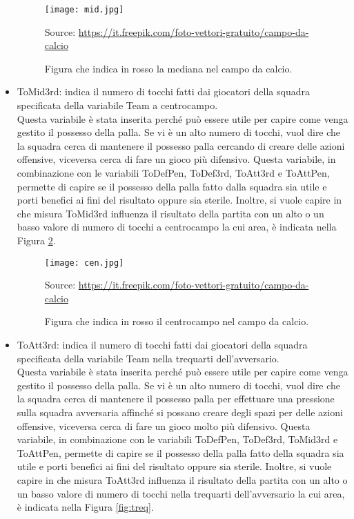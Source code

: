 \begin{itemize}
	\begin{figure}[!ht]
		\begin{center}
			\texttt{[image: mid.jpg]}
			\caption{Figura che indica in rosso la mediana nel campo da calcio.} 
			Source: \url{https://it.freepik.com/foto-vettori-gratuito/campo-da-calcio} 
			\label{fig:def}
		\end{center}
	\end{figure}
	\item \textsf{ToMid3rd}: indica il numero di tocchi fatti dai giocatori della squadra specificata della variabile \textsf{Team} a centrocampo. \\
	Questa variabile è stata inserita perché può essere utile per capire come venga gestito il possesso della palla. Se vi è un alto numero di tocchi, vuol dire che la squadra cerca di mantenere il possesso palla cercando di creare delle azioni offensive, viceversa cerca di fare un gioco più difensivo. Questa variabile, in combinazione con le variabili \textsf{ToDefPen}, \textsf{ToDef3rd}, \textsf{ToAtt3rd} e \textsf{ToAttPen}, permette di capire se il possesso della palla fatto dalla squadra sia utile e porti benefici ai fini del risultato oppure sia sterile. Inoltre, si vuole capire in che misura \textsf{ToMid3rd} influenza il risultato della partita con un alto o un basso valore di numero di tocchi a centrocampo la cui area, è indicata nella Figura \ref{fig:cen}.
	
	\begin{figure}[!ht]
		\begin{center}
			\texttt{[image: cen.jpg]}
			\caption{Figura che indica in rosso il centrocampo nel campo da calcio.}
			Source: \url{https://it.freepik.com/foto-vettori-gratuito/campo-da-calcio}  
			\label{fig:cen}
		\end{center}
	\end{figure}
	
	\item \textsf{ToAtt3rd}: indica il numero di tocchi fatti dai giocatori della squadra specificata della variabile \textsf{Team} nella trequarti dell'avversario. \\
	Questa variabile è stata inserita perché può essere utile per capire come venga gestito il possesso della palla. Se vi è un alto numero di tocchi, vuol dire che la squadra cerca di mantenere il possesso palla per effettuare una pressione sulla squadra avversaria affinché si possano creare degli spazi per delle azioni offensive, viceversa cerca di fare un gioco molto più difensivo. Questa variabile, in combinazione con le variabili \textsf{ToDefPen}, \textsf{ToDef3rd}, \textsf{ToMid3rd} e \textsf{ToAttPen}, permette di capire se il possesso della palla fatto della squadra sia utile e porti benefici ai fini del risultato oppure sia sterile. Inoltre, si vuole capire in che misura \textsf{ToAtt3rd} influenza il risultato della partita con un alto o un basso valore di numero di tocchi nella trequarti dell'avversario la cui area, è indicata nella Figura \ref{fig:treq}.
	

\end{itemize}
